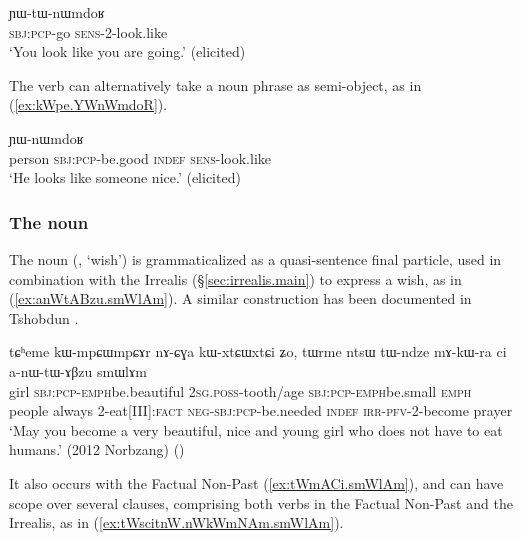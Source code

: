 \begin{exe}
	\ex \label{ex:kWCe.YWtWnWmdoR}
	\gll [kɯ-ɕe] ɲɯ-tɯ-nɯmdoʁ \\
	\textsc{sbj}:\textsc{pcp}-go \textsc{sens}-2-look.like \\
	\glt `You look like you are going.' (elicited)
\end{exe}  

The verb  can alternatively take a noun phrase as semi-object, as in (\ref{ex:kWpe.YWnWmdoR}).

\begin{exe}
	\ex \label{ex:kWpe.YWnWmdoR}
	\gll [tɯrme kɯ-pe ci] ɲɯ-nɯmdoʁ \\
	person \textsc{sbj}:\textsc{pcp}-be.good \textsc{indef} \textsc{sens}-look.like \\
	\glt `He looks like someone nice.' (elicited)
\end{exe}  



\subsubsection{The noun  } \label{sec:smWlAm.TAME}
The noun  (, `wish') is grammaticalized as a quasi-sentence final particle, used in combination with the Irrealis (§\ref{sec:irrealis.main}) to express a wish, as in (\ref{ex:anWtABzu.smWlAm}). A similar construction has been documented in Tshobdun \citep{jackson07irrealis}.

\begin{exe}
	\ex \label{ex:anWtABzu.smWlAm}
	\gll tɕʰeme kɯ-mpɕɯ\redp{}mpɕɤr nɤ-ɕɣa kɯ-xtɕɯ\redp{}xtɕi ʑo, tɯrme ntsɯ tɯ-ndze mɤ-kɯ-ra ci a-nɯ-tɯ-ɤβzu smɯlɤm \\
	girl \textsc{sbj}:\textsc{pcp}-\textsc{emph}\redp{}be.beautiful   \textsc{2sg}.\textsc{poss}-tooth/age  \textsc{sbj}:\textsc{pcp}-\textsc{emph}\redp{}be.small \textsc{emph}  people always 2-eat[III]:\textsc{fact} \textsc{neg}-\textsc{sbj}:\textsc{pcp}-be.needed \textsc{indef} \textsc{irr}-\textsc{pfv}-2-become prayer \\
	\glt `May you become a very beautiful, nice and young girl who does not have to eat humans.' (2012 Norbzang)
()
\end{exe}

It also occurs with the Factual Non-Past (\ref{ex:tWmACi.smWlAm}), and can have scope over several clauses, comprising both verbs in the Factual Non-Past and the Irrealis, as in (\ref{ex:tWscitnW.nWkWmNAm.smWlAm}).

